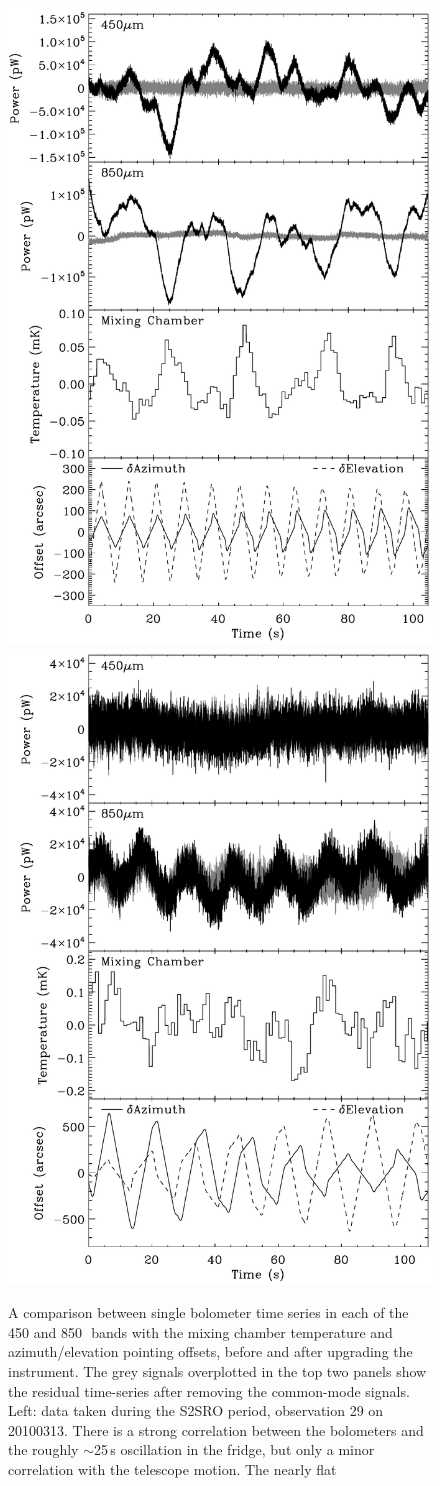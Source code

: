 \documentclass[useAMS,usenatbib,nofootinbib]{mn2e}
\begin{document}
\begin{figure}
\includegraphics[width=0.49\linewidth]{bolos_point_mix_s2sro.pdf}
\includegraphics[width=0.49\linewidth]{bolos_point_mix.pdf}
\caption{A comparison between single bolometer time series in each of
  the 450 and 850\,\micron\ bands with the mixing chamber temperature
  and azimuth/elevation pointing offsets, before and after upgrading
  the instrument. The grey signals overplotted in the top two panels
  show the residual time-series after removing the common-mode
  signals.  Left: data taken during the S2SRO period, observation 29
  on 20100313. There is a strong correlation between the bolometers
  and the roughly $\sim$25\,s oscillation in the fridge, but only a
  minor correlation with the telescope motion. The nearly flat
}
\end{figure}
\end{document}
